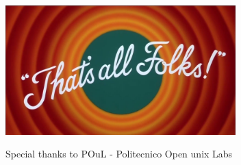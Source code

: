 \documentclass[10pt, aspectratio=169]{beamer}
\begin{document}
\begin{frame}{\,}
	\begin{center}
		\includegraphics[height=5cm]{images/thats-all-folks.jpg}
	\end{center}
	\begin{block}{}
		Special thanks to POuL - Politecnico Open unix Labs
	\end{block}
	
\end{frame}
\end{document}
